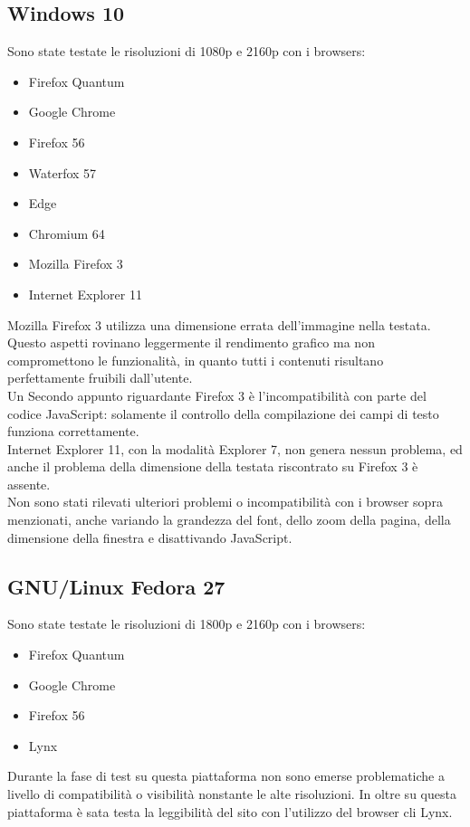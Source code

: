 \documentclass[openany, a4paper, 12pt]{report}
\begin{document}
				\subsection{Windows 10}
				Sono state testate le risoluzioni di 1080p e 2160p con i browsers:
				\begin{itemize}
					\item Firefox Quantum
					\item Google Chrome
					\item Firefox 56
					\item Waterfox 57
					\item Edge
					\item Chromium 64
					\item Mozilla Firefox 3
					\item Internet Explorer 11
				\end{itemize}
				Mozilla Firefox 3 utilizza una dimensione errata dell'immagine nella testata. Questo aspetti rovinano leggermente il rendimento grafico ma non compromettono le funzionalità, in quanto tutti i contenuti risultano perfettamente fruibili dall'utente.\\
				Un Secondo appunto riguardante Firefox 3 è l'incompatibilità con parte del codice JavaScript: solamente il controllo della compilazione dei campi di testo funziona correttamente.\\
				Internet Explorer 11, con la modalità Explorer 7, non genera nessun problema, ed anche il problema della dimensione della testata riscontrato su Firefox 3  è assente.\\
				Non sono stati rilevati ulteriori problemi o incompatibilità con i browser sopra menzionati, anche variando la grandezza del font, dello zoom della pagina, della dimensione della finestra e disattivando JavaScript.

				\subsection{GNU/Linux Fedora 27}
				Sono state testate le risoluzioni di 1800p e 2160p con i browsers:
				\begin{itemize}
					\item Firefox Quantum
					\item Google Chrome
					\item Firefox 56
					\item Lynx
				\end{itemize}
				Durante la fase di test su questa piattaforma non sono emerse problematiche a livello di compatibilità o visibilità nonstante le alte risoluzioni. In oltre su questa piattaforma è sata testa la leggibilità del sito con l'utilizzo del browser cli Lynx.
\end{document}
